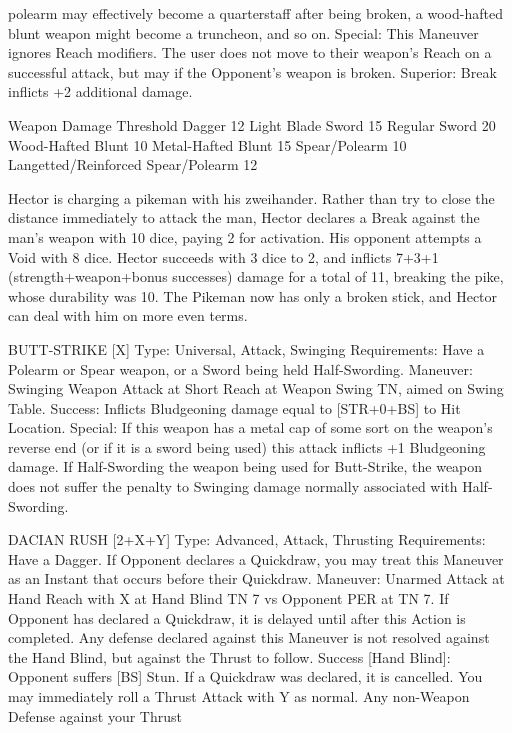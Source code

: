 \documentclass[oneside,11pt,english]{book}
\begin{document}
polearm may effectively become a quarterstaff after being broken, a wood-hafted blunt weapon might 
become a truncheon, and so on. 
Special: This Maneuver ignores Reach modifiers. The user does not move to their weapon’s Reach on a 
successful attack, but may if the Opponent’s weapon is broken. 
Superior: Break inflicts +2 additional damage. 

 

Weapon Damage Threshold 
Dagger 12 
Light Blade Sword 15 
Regular Sword 20 
Wood-Hafted Blunt 10 
Metal-Hafted Blunt 15 
Spear/Polearm 10 
Langetted/Reinforced Spear/Polearm 12 

 
Hector is charging a pikeman with his zweihander. Rather than try to close the distance immediately to 
attack the man, Hector declares a Break against the man’s weapon with 10 dice, paying 2 for activation. 
His opponent attempts a Void with 8 dice. Hector succeeds with 3 dice to 2, and inflicts 7+3+1 
(strength+weapon+bonus successes) damage for a total of 11, breaking the pike, whose durability was 
10. The Pikeman now has only a broken stick, and Hector can deal with him on more even terms. 

 

BUTT-STRIKE [X] 
Type: Universal, Attack, Swinging 
Requirements: Have a Polearm or Spear weapon, or a Sword being held Half-Swording. 
Maneuver: Swinging Weapon Attack at Short Reach at Weapon Swing TN, aimed on Swing Table. 
Success: Inflicts Bludgeoning damage equal to [STR+0+BS] to Hit Location. 
Special: If this weapon has a metal cap of some sort on the weapon’s reverse end (or if it is a sword being 
used) this attack inflicts +1 Bludgeoning damage. 
If Half-Swording the weapon being used for Butt-Strike, the weapon does not suffer the penalty to 
Swinging damage normally associated with Half-Swording. 

 

DACIAN RUSH [2+X+Y] 
Type: Advanced, Attack, Thrusting 
Requirements: Have a Dagger. If Opponent declares a Quickdraw, you may treat this Maneuver as an 
Instant that occurs before their Quickdraw. 
Maneuver: Unarmed Attack at Hand Reach with X at Hand Blind TN 7 vs Opponent PER at TN 7. If 
Opponent has declared a Quickdraw, it is delayed until after this Action is completed. Any defense 
declared against this Maneuver is not resolved against the Hand Blind, but against the Thrust to follow. 
Success [Hand Blind]: Opponent suffers [BS] Stun. If a Quickdraw was declared, it is cancelled. You 
may immediately roll a Thrust Attack with Y as normal. Any non-Weapon Defense against your Thrust 
\end{document}
